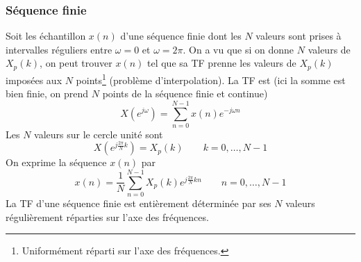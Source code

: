 		\subsubsection{Séquence finie}
		Soit les échantillon $x(n)$ d'une séquence finie dont les $N$ valeurs sont prises à intervalles 
		réguliers entre $\omega=0$ et $\omega=2\pi$. On a vu que si on donne $N$ valeurs de $X_p(k)$, 
		on peut trouver $x(n)$ tel que sa TF prenne les valeurs de $X_p(k)$ imposées aux $N$ points\footnote{
		Uniformément réparti sur l'axe des fréquences.} (problème d'interpolation). La TF est (ici la somme 
		est bien finie, on prend $N$ points de la séquence finie et continue)
		\begin{equation}
		X(e^{j\omega}) = \sum_{n=0}^{N-1} x(n)e^{-j\omega n}
		\end{equation}
		Les $N$ valeurs sur le cercle unité sont 
		\begin{equation}
		X(e^{j\frac{2\pi}{N}k}) = X_p(k)\qquad k=0,\dots,N-1
		\end{equation}
		On exprime la séquence $x(n)$ par
		\begin{equation}
		x(n) = \frac{1}{N}\sum_{n=0}^{N-1} X_p(k)e^{j\frac{2\pi}{N}kn}\qquad n=0,\dots,N-1
		\end{equation}
		La TF d'une séquence finie est entièrement déterminée par ses $N$ valeurs régulièrement 
		réparties sur l'axe des fréquences.
	
	
